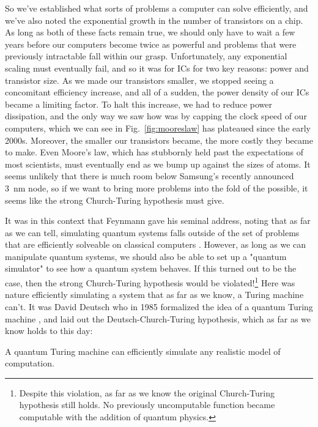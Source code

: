 So we've established what sorts of problems a computer can solve efficiently, and we've also noted the
exponential growth in the number of transistors on a chip. As long as both of these facts remain true, we
should only have to wait a few years before our computers become twice as powerful and problems that were
previously intractable fall within our grasp. Unfortunately, any exponential scaling must eventually fail,
and so it was for ICs for two key reasons: power and transistor size. As we made our transistors smaller,
we stopped seeing a concomitant efficiency increase, and all of a sudden, the power density of our ICs
became a limiting factor. To halt this increase, we had to reduce power dissipation, and the
only way we saw how was by capping the clock speed of our computers, which we can see in Fig.~\ref{fig:mooreslaw}
has plateaued since the early 2000s. Moreover, the smaller our transistors became, the more costly they became
to make. Even Moore's law, which has stubbornly held past the expectations of most scientists, must eventually
end as we bump up against the sizes of atoms. It seems unlikely that there is much room below Samsung's
recently announced \SI{3}{\nano\meter} node, so if we want to bring more problems into the fold of the
possible, it seems like the strong Church-Turing hypothesis must give.

It was in this context that Feynmann gave his seminal address, noting that as far as we can tell, simulating
quantum systems falls outside of the set of problems that are efficiently solveable on classical computers \cite{Feynman1982}.
However, as long as we can manipulate quantum systems, we should also be able to set up a "quantum
simulator" to see how a quantum system behaves. If this turned out to be the case, then the strong
Church-Turing hypothesis would be violated!\footnote{Despite this violation, as far as we know the original
Church-Turing hypothesis still holds. No previously uncomputable function became computable with the addition
of quantum physics.} Here was nature efficiently simulating a system that as far as we know, a Turing machine
can't. It was David Deutsch who in 1985 formalized the idea of a quantum Turing machine \cite{doi:10.1098/rspa.1985.0070},
and laid out the Deutsch-Church-Turing hypothesis, which as far as we know holds to this day:

\begin{displayquote}
  A quantum Turing machine can efficiently simulate any realistic model of computation.
\end{displayquote}

